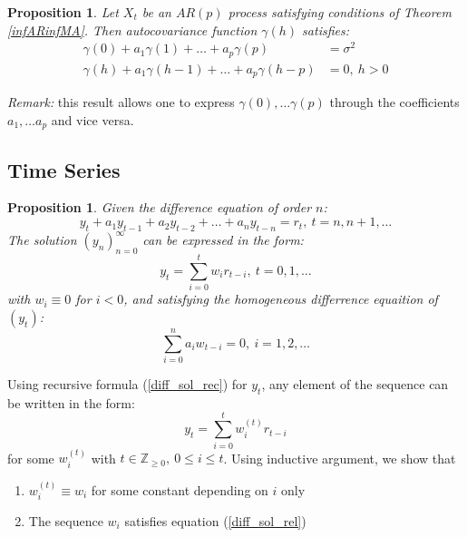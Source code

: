 \documentclass[12pt]{article}
\newtheorem{proposition}[theorem]{Proposition}
\theoremstyle{definition}
\theoremstyle{remark}
\numberwithin{equation}{section}
\newcommand{\ZZ}{\mathbb{Z}}
\begin{document}
\begin{proposition}
	Let $X_t$ be an $AR(p)$ process satisfying conditions of Theorem \ref{infARinfMA}. Then autocovariance function $\gamma(h)$ satisfies:
	\begin{align*}
		\gamma(0) + a_1\gamma(1) +\ldots +a_p\gamma(p) &= \sigma^2\\
		\gamma(h) + a_1\gamma(h-1) +\ldots +a_p\gamma(h-p) &= 0,\ h>0
	\end{align*}
\end{proposition}
\noindent\emph{Remark:} this result allows one to express $\gamma(0), \ldots \gamma(p)$ through the coefficients $a_1,\ldots a_p$ and vice versa.

\subsection{Time Series}

\begin{proposition}\label{diff_sol}
	Given the difference equation of order $n$:
	\begin{equation}\label{diff_sol_rec}
		y_t + a_1y_{t-1} + a_2y_{t-2} + \ldots + a_ny_{t-n} = r_t, \ t = n, n+1, \ldots
	\end{equation}
	The solution $\left(y_n\right)_{n = 0}^{\infty}$ can be expressed in the form:
	\begin{equation*}
		y_t =  \sum_{i = 0}^t w_ir_{t-i}, \ t = 0, 1, \ldots
	\end{equation*}
	with $w_i\equiv0$ for $i<0$, and satisfying the homogeneous differrence equaition of $(y_t)$:
	\begin{equation}\label{diff_sol_rel}
		\sum_{i = 0}^n a_iw_{t-i} = 0,\ i = 1, 2,\ldots
	\end{equation}

\end{proposition}
\proof
Using recursive formula (\ref{diff_sol_rec}) for $y_t$, any element of the sequence can be written in the form:
\begin{equation*}
	y_t = \sum_{i = 0}^t w_i^{(t)} r_{t-i}
\end{equation*}
for some $w_i^{(t)}$ with $t\in\ZZ_{\geq 0},\ 0\leq i\leq t$.
Using inductive argument, we show that
\begin{enumerate}
	\item $w_i^{(t)}\equiv w_i$ for some constant depending on $i$ only
	\item The sequence $w_i$ satisfies equation (\ref{diff_sol_rel})
\end{enumerate}
\end{document}
